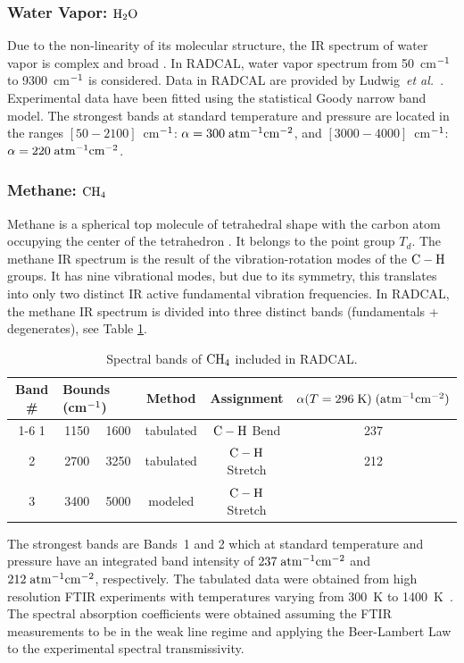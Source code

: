 \subsubsection{Water Vapor: $\rm H_2O$}

Due to the non-linearity of its molecular structure, the IR spectrum of water vapor is complex and broad \cite{Herzberg:1949}. In RADCAL, water vapor spectrum from 50~cm$\rm ^{-1}$ to 9300~cm$\rm ^{-1}$ is considered. Data in RADCAL are provided by Ludwig~\textit{et al.}~\cite{Ludwig:NASA}. Experimental data have been fitted using the statistical Goody narrow band model. The strongest bands at standard temperature and pressure are located in the ranges $\left[50-2100\right]$~cm$\rm ^{-1}$: $\alpha = 300\;\rm {atm^{-1}cm^{-2}}$, and $\left[3000-4000\right]$~cm$\rm ^{-1}$: $\alpha = 220\;\rm {atm^{-1}cm^{-2}}$.

\subsubsection{Methane: $\rm CH_4$}

Methane is a spherical top molecule of tetrahedral shape with the carbon atom occupying the center of the tetrahedron \cite{Herzberg:1949}. It belongs to the point group $T_d$. The methane IR spectrum is the result of the vibration-rotation modes of the $\rm C-H$ groups. It has nine vibrational modes, but due to its symmetry, this translates into only two distinct IR active fundamental vibration frequencies. In RADCAL, the methane IR spectrum is divided into three distinct bands (fundamentals + degenerates), see Table \ref{Table::CH4}.
\begin{table}[ht]
      \centering
      \caption[Spectral bands of $\rm CH_4$ included in RADCAL]{Spectral bands of $\rm CH_4$ included in RADCAL.}
      \vspace{0.1in}
      \label{Table::CH4}
    \begin{tabular}{|c|c|c|c|c|c|}
    \hline
    Band \# & \multicolumn{2}{|l|}{Bounds (cm$\rm ^{-1}$) } & Method & Assignment & $\alpha(T=296 \; {\rm K}) \; (\rm {atm^{-1} cm^{-2}})$   \\
    \cline{1-6}
    1 & 1150 & 1600 & tabulated &  $\rm C-H$ Bend    & 237  \\
    2 & 2700 & 3250 & tabulated &  $\rm C-H$ Stretch & 212  \\
    3 & 3400 & 5000 & modeled   &  $\rm C-H$ Stretch &   \\
    \hline
   \end{tabular}
\end{table}
The strongest bands are Bands~1 and 2 which at standard temperature and pressure have an integrated band intensity of $237\;\rm {atm^{-1}cm^{-2}}$ and $212\;\rm {atm^{-1}cm^{-2}}$, respectively. The tabulated data were obtained from high resolution FTIR experiments with temperatures varying from 300~K to 1400~K~\cite{Wakatsuki:2005}. The spectral absorption coefficients were obtained assuming the FTIR measurements to be in the weak line regime and applying the Beer-Lambert Law to the experimental spectral transmissivity.




